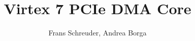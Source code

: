 \author{Frans Schreuder, Andrea Borga}
\title{Virtex 7 PCIe DMA Core}

\date{\SetDocumentDate}
\def\DocVer{Rev 2.0}
\def\SetDocumentDate{21-01-2015}














